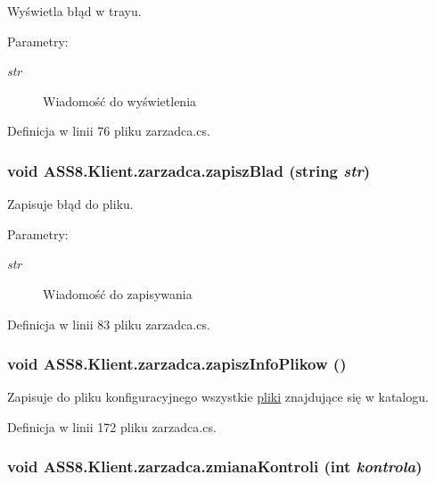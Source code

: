 Wyświetla błąd w trayu. 

\begin{Desc}
\item[Parametry:]
\begin{description}
\item[{\em str}]Wiadomość do wyświetlenia\end{description}
\end{Desc}


Definicja w linii 76 pliku zarzadca.cs.\hypertarget{a00037_b543bc78feea7f86bace90f920f17511}{
\subsubsection[{zapiszBlad}]{\setlength{\rightskip}{0pt plus 5cm}void ASS8.Klient.zarzadca.zapiszBlad (string {\em str})}}
\label{d1/dc6/a00037_b543bc78feea7f86bace90f920f17511}


Zapisuje błąd do pliku. 

\begin{Desc}
\item[Parametry:]
\begin{description}
\item[{\em str}]Wiadomość do zapisywania\end{description}
\end{Desc}


Definicja w linii 83 pliku zarzadca.cs.\hypertarget{a00037_0b7572681d52b2aff3d3b300639e66b9}{
\subsubsection[{zapiszInfoPlikow}]{\setlength{\rightskip}{0pt plus 5cm}void ASS8.Klient.zarzadca.zapiszInfoPlikow ()}}
\label{d1/dc6/a00037_0b7572681d52b2aff3d3b300639e66b9}


Zapisuje do pliku konfiguracyjnego wszystkie \hyperlink{a00017}{pliki} znajdujące się w katalogu. 



Definicja w linii 172 pliku zarzadca.cs.\hypertarget{a00037_facd9f376d18bedf9eb790ea68e23cf2}{
\subsubsection[{zmianaKontroli}]{\setlength{\rightskip}{0pt plus 5cm}void ASS8.Klient.zarzadca.zmianaKontroli (int {\em kontrola})}}
\label{d1/dc6/a00037_facd9f376d18bedf9eb790ea68e23cf2}


